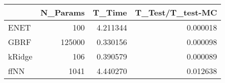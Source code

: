\begin{tabular}{lrrr}
\toprule
{} &  N\_Params &    T\_Time &  T\_Test/T\_test-MC \\
\midrule
ENET   &       100 &  4.211344 &          0.000018 \\
GBRF   &    125000 &  0.330156 &          0.000098 \\
kRidge &       106 &  0.390579 &          0.000089 \\
ffNN   &      1041 &  4.440270 &          0.012638 \\
\bottomrule
\end{tabular}
